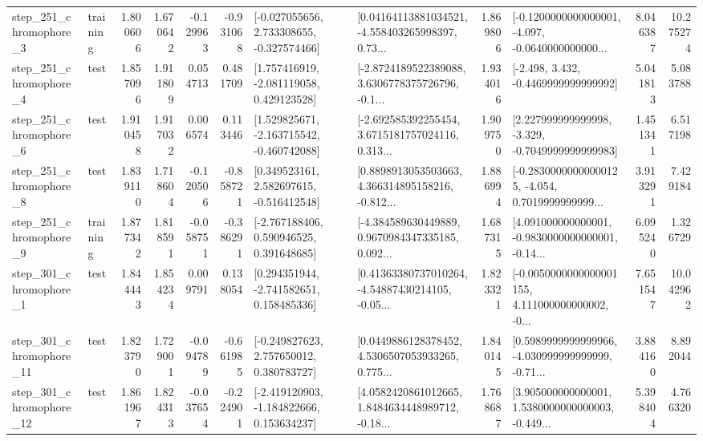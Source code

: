 \begin{tabular}{llrrrrllrlrr}
   step\_251\_chromophore\_3 &  training &      1.800606 &    1.670642 &     -0.129963 & -0.931068 &   [-0.027055656, 2.733308655, -0.327574466] &  [0.04164113881034521, -4.558403265998397, 0.73... &       1.869806 &  [-0.1200000000000001, -4.097, -0.0640000000000... &            8.046387 &         10.275274 \\
   step\_251\_chromophore\_4 &      test &      1.857096 &    1.911809 &      0.054713 &  0.481709 &    [1.757416919, -2.081119058, 0.429123528] &  [-2.8724189522389088, 3.6306778375726796, -0.1... &       1.934016 &               [-2.498, 3.432, -0.4469999999999992] &            5.041813 &          5.083788 \\
   step\_251\_chromophore\_6 &      test &      1.910458 &    1.917032 &      0.006574 &  0.113446 &   [1.529825671, -2.163715542, -0.460742088] &  [-2.692585392255454, 3.6715181757024116, 0.313... &       1.909750 &   [2.227999999999998, -3.329, -0.7049999999999983] &            1.451341 &          6.517198 \\
   step\_251\_chromophore\_8 &      test &      1.839110 &    1.718604 &     -0.120506 & -0.858721 &    [0.349523161, 2.582697615, -0.516412548] &  [0.8898913053503663, 4.366314895158216, -0.812... &       1.886994 &  [-0.28300000000000125, -4.054, 0.7019999999999... &            3.913291 &          7.429184 \\
   step\_251\_chromophore\_9 &  training &      1.877342 &    1.818591 &     -0.058751 & -0.386291 &    [-2.767188406, 0.590946525, 0.391648685] &  [-4.384589630449889, 0.9670984347335185, 0.092... &       1.687315 &  [4.091000000000001, -0.9830000000000001, -0.14... &            6.095240 &          1.326729 \\
   step\_301\_chromophore\_1 &      test &      1.844443 &    1.854234 &      0.009791 &  0.138054 &    [0.294351944, -2.741582651, 0.158485336] &  [0.41363380737010264, -4.54887430214105, -0.05... &       1.823321 &  [-0.0050000000000001155, 4.111000000000002, -0... &            7.651547 &         10.042962 \\
  step\_301\_chromophore\_11 &      test &      1.823790 &    1.729001 &     -0.094789 & -0.661985 &    [-0.249827623, 2.757650012, 0.380783727] &  [0.0449886128378452, 4.5306507053933265, 0.775... &       1.840145 &  [0.5989999999999966, -4.030999999999999, -0.71... &            3.884160 &          8.892044 \\
  step\_301\_chromophore\_12 &      test &      1.861967 &    1.824313 &     -0.037654 & -0.224901 &   [-2.419120903, -1.184822666, 0.153634237] &  [4.0582420861012665, 1.8484634448989712, -0.18... &       1.768687 &  [3.905000000000001, 1.5380000000000003, -0.449... &            5.398404 &          4.766320 \\

\end{tabular}
